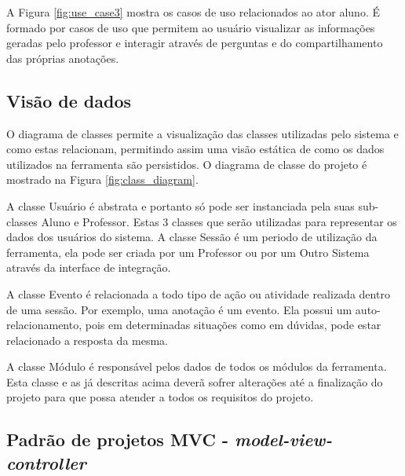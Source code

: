A Figura \ref{fig:use_case3} mostra os casos de uso relacionados ao ator aluno. É formado por casos de uso que permitem ao usuário visualizar as informações geradas pelo professor e interagir através de perguntas e do compartilhamento das próprias anotações.

 

\subsection{Visão de dados}

O diagrama de classes permite a visualização das classes utilizadas pelo sistema e como estas relacionam, permitindo assim uma visão estática de como os dados utilizados na ferramenta são persistidos. O diagrama de classe do projeto é mostrado na Figura \ref{fig:class_diagram}.

 


A classe Usuário é abstrata e portanto só pode ser instanciada pela suas sub-classes Aluno e Professor. Estas 3 classes que serão utilizadas para representar os dados dos usuários do sistema. A classe Sessão é um periodo de utilização da ferramenta, ela pode ser criada por um Professor ou por um Outro Sistema através da interface de integração.

A classe Evento é relacionada a todo tipo de ação ou atividade realizada dentro de uma sessão. Por exemplo, uma anotação é um evento. Ela possui um auto-relacionamento, pois em determinadas situações como em dúvidas,  pode estar relacionado a resposta da mesma.

A classe Módulo é responsável pelos dados de todos os módulos da ferramenta. Esta classe e as já descritas acima deverã sofrer alterações até a finalização do projeto para que possa atender a todos os requisitos do projeto. 

\iffalse
\subsection{Padrão de projetos MVC - \emph{model-view-controller}}

